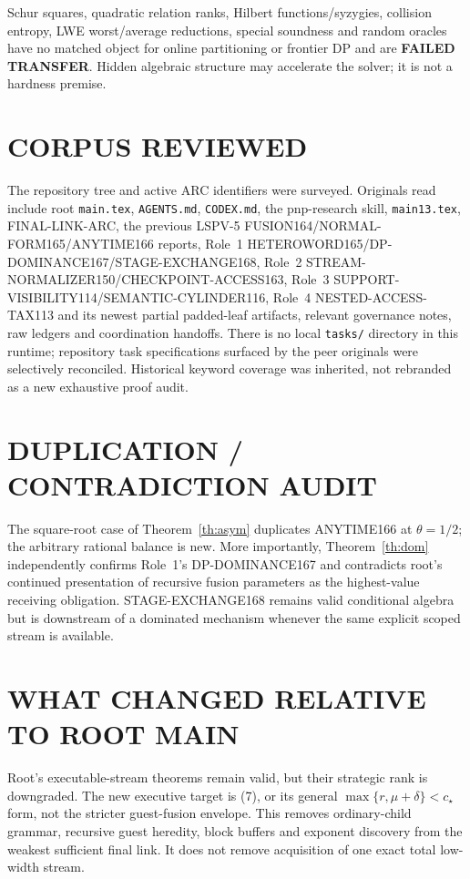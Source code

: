 \documentclass[11pt]{article}
\begin{document}
Schur squares, quadratic relation ranks, Hilbert functions/syzygies,
collision entropy, LWE worst/average reductions, special soundness and random
oracles have no matched object for online partitioning or frontier DP and are
\textbf{FAILED TRANSFER}.  Hidden algebraic structure may accelerate the
solver; it is not a hardness premise.

\section{CORPUS REVIEWED}
The repository tree and active ARC identifiers were surveyed.  Originals read
include root \texttt{main.tex}, \texttt{AGENTS.md}, \texttt{CODEX.md}, the
pnp-research skill, \texttt{main13.tex}, FINAL-LINK-ARC, the previous
LSPV-5 FUSION164/NORMAL-FORM165/ANYTIME166 reports, Role~1
HETEROWORD165/DP-DOMINANCE167/STAGE-EXCHANGE168, Role~2
STREAM-NORMALIZER150/CHECKPOINT-ACCESS163, Role~3
SUPPORT-VISIBILITY114/SEMANTIC-CYLINDER116, Role~4
NESTED-ACCESS-TAX113 and its newest partial padded-leaf artifacts, relevant
governance notes, raw ledgers and coordination handoffs.  There is no local
\texttt{tasks/} directory in this runtime; repository task specifications
surfaced by the peer originals were selectively reconciled.  Historical
keyword coverage was inherited, not rebranded as a new exhaustive proof audit.

\section{DUPLICATION / CONTRADICTION AUDIT}
The square-root case of Theorem~\ref{th:asym} duplicates ANYTIME166 at
$\theta=1/2$; the arbitrary rational balance is new.  More importantly,
Theorem~\ref{th:dom} independently confirms Role~1's DP-DOMINANCE167 and
contradicts root's continued presentation of recursive fusion parameters as
the highest-value receiving obligation.  STAGE-EXCHANGE168 remains valid
conditional algebra but is downstream of a dominated mechanism whenever the
same explicit scoped stream is available.

\section{WHAT CHANGED RELATIVE TO ROOT MAIN}
Root's executable-stream theorems remain valid, but their strategic rank is
downgraded.  The new executive target is (7), or its general
$\max\{r,\mu+\delta\}<c_\star$ form, not the stricter guest-fusion envelope.
This removes ordinary-child grammar, recursive guest heredity, block buffers
and exponent discovery from the weakest sufficient final link.  It does not
remove acquisition of one exact total low-width stream.
\end{document}

